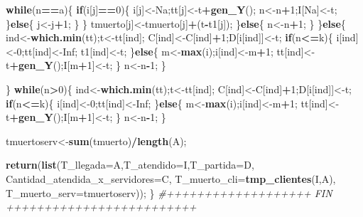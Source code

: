 \documentclass[]{article}
\newenvironment{Shaded}{\begin{snugshade}}{\end{snugshade}}
\newcommand{\KeywordTok}[1]{\textcolor[rgb]{0.13,0.29,0.53}{\textbf{#1}}}
\newcommand{\DataTypeTok}[1]{\textcolor[rgb]{0.13,0.29,0.53}{#1}}
\newcommand{\DecValTok}[1]{\textcolor[rgb]{0.00,0.00,0.81}{#1}}
\newcommand{\CommentTok}[1]{\textcolor[rgb]{0.56,0.35,0.01}{\textit{#1}}}
\newcommand{\OtherTok}[1]{\textcolor[rgb]{0.56,0.35,0.01}{#1}}
\newcommand{\ControlFlowTok}[1]{\textcolor[rgb]{0.13,0.29,0.53}{\textbf{#1}}}
\newcommand{\OperatorTok}[1]{\textcolor[rgb]{0.81,0.36,0.00}{\textbf{#1}}}
\newcommand{\NormalTok}[1]{#1}
\begin{document}
\begin{Shaded}
\begin{Highlighting}[]
        \ControlFlowTok{while}\NormalTok{(n}\OperatorTok{==}\NormalTok{a)\{}
          \ControlFlowTok{if}\NormalTok{(i[j]}\OperatorTok{==}\DecValTok{0}\NormalTok{)\{}
\NormalTok{            i[j]<-Na;tt[j]<-t}\OperatorTok{+}\KeywordTok{gen_Y}\NormalTok{();}
\NormalTok{            n<-n}\OperatorTok{+}\DecValTok{1}\NormalTok{;I[Na]<-t;}
\NormalTok{          \}}\ControlFlowTok{else}\NormalTok{\{}
\NormalTok{            j<-j}\OperatorTok{+}\DecValTok{1}\NormalTok{;}
\NormalTok{          \}}
\NormalTok{        \}}
\NormalTok{        tmuerto[j]<-tmuerto[j]}\OperatorTok{+}\NormalTok{(t}\OperatorTok{-}\NormalTok{t1[j]);}
\NormalTok{      \}}\ControlFlowTok{else}\NormalTok{\{}
\NormalTok{        n<-n}\OperatorTok{+}\DecValTok{1}\NormalTok{;}
\NormalTok{      \}}
\NormalTok{    \}}\ControlFlowTok{else}\NormalTok{\{}
\NormalTok{      ind<-}\KeywordTok{which.min}\NormalTok{(tt);t<-tt[ind];}
\NormalTok{      C[ind]<-C[ind]}\OperatorTok{+}\DecValTok{1}\NormalTok{;D[i[ind]]<-t;}
      \ControlFlowTok{if}\NormalTok{(n}\OperatorTok{<=}\NormalTok{k)\{}
\NormalTok{        i[ind]<-}\DecValTok{0}\NormalTok{;tt[ind]<-}\OtherTok{Inf}\NormalTok{;}
\NormalTok{        t1[ind]<-t;}
\NormalTok{      \}}\ControlFlowTok{else}\NormalTok{\{}
\NormalTok{        m<-}\KeywordTok{max}\NormalTok{(i);i[ind]<-m}\OperatorTok{+}\DecValTok{1}\NormalTok{;}
\NormalTok{        tt[ind]<-t}\OperatorTok{+}\KeywordTok{gen_Y}\NormalTok{();I[m}\OperatorTok{+}\DecValTok{1}\NormalTok{]<-t;}
\NormalTok{      \}}
\NormalTok{      n<-n}\OperatorTok{-}\DecValTok{1}\NormalTok{;       }
\NormalTok{    \}}
    
\NormalTok{  \}}
  \ControlFlowTok{while}\NormalTok{(n}\OperatorTok{>}\DecValTok{0}\NormalTok{)\{}
\NormalTok{    ind<-}\KeywordTok{which.min}\NormalTok{(tt);t<-tt[ind];}
\NormalTok{    C[ind]<-C[ind]}\OperatorTok{+}\DecValTok{1}\NormalTok{;D[i[ind]]<-t;}
    \ControlFlowTok{if}\NormalTok{(n}\OperatorTok{<=}\NormalTok{k)\{}
\NormalTok{      i[ind]<-}\DecValTok{0}\NormalTok{;tt[ind]<-}\OtherTok{Inf}\NormalTok{;}
\NormalTok{    \}}\ControlFlowTok{else}\NormalTok{\{}
\NormalTok{      m<-}\KeywordTok{max}\NormalTok{(i);i[ind]<-m}\OperatorTok{+}\DecValTok{1}\NormalTok{;}
\NormalTok{      tt[ind]<-t}\OperatorTok{+}\KeywordTok{gen_Y}\NormalTok{();I[m}\OperatorTok{+}\DecValTok{1}\NormalTok{]<-t;}
\NormalTok{    \}}
\NormalTok{    n<-n}\OperatorTok{-}\DecValTok{1}\NormalTok{;}
\NormalTok{  \}}

\NormalTok{  tmuertoserv<-}\KeywordTok{sum}\NormalTok{(tmuerto)}\OperatorTok{/}\KeywordTok{length}\NormalTok{(A);}
  
  \KeywordTok{return}\NormalTok{(}\KeywordTok{list}\NormalTok{(}\DataTypeTok{T_llegada=}\NormalTok{A,}\DataTypeTok{T_atendido=}\NormalTok{I,}\DataTypeTok{T_partida=}\NormalTok{D,}
            \DataTypeTok{Cantidad_atendida_x_servidores=}\NormalTok{C,}
            \DataTypeTok{T_muerto_cli=}\KeywordTok{tmp_clientes}\NormalTok{(I,A),}
            \DataTypeTok{T_muerto_serv=}\NormalTok{tmuertoserv));}
\NormalTok{\}}
\CommentTok{#+++++++++++++++++++  FIN +++++++++++++++++++++++++}
\end{Highlighting}
\end{Shaded}
\end{document}
